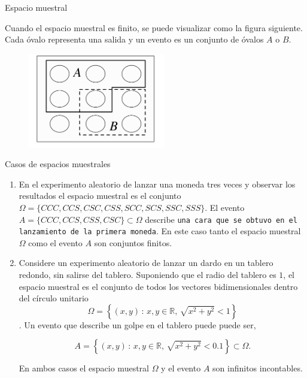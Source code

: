 \documentclass{beamer}
\begin{document}
   \begin{frame}{Espacio muestral }
   	
   	Cuando el espacio muestral es finito, se puede visualizar como la figura siguiente. Cada \'ovalo representa una salida y un evento es un conjunto de \'ovalos $A$ o $B$.
   	
   	\begin{figure}[h]
   		\centering
   		\includegraphics[width=6cm]{p1}
   	\end{figure}
   	
   	\end{frame}
 \begin{frame}{Casos de espacios muestrales}
 	
\begin{enumerate}
 \item \scriptsize {En el experimento aleatorio de lanzar una moneda tres veces y observar los resultados el espacio muestral es el conjunto $\Omega=\{CCC,CCS,CSC,CSS,SCC,SCS,SSC,SSS\}$. El evento $A=\{CCC,CCS,CSS,CSC\}\subset \Omega$ describe \texttt{una cara que se obtuvo en el lanzamiento de la primera moneda}. En este caso tanto el espacio muestral $\Omega$ como el evento $A$ son conjuntos finitos.}
 
 \item \scriptsize{ Considere un experimento aleatorio de lanzar un dardo en un tablero redondo, sin salirse del tablero. Suponiendo que el radio del tablero es $1$, el espacio muestral  es el conjunto de todos los vectores bidimensionales dentro del c\'irculo unitario $$\Omega=\left\{(x,y)\,:\, x,y\in\mathbb{R}, \,\sqrt{x^2+y^2} < 1\right\}$$. Un evento que describe un golpe en el tablero puede  puede ser,
 
 \[
 A=\left\{(x,y)\, : \,x,y\in\mathbb{R}, \,\sqrt{x^2+y^2} < 0.1\right\}\subset\Omega.
 \]
 
 En ambos casos el espacio muestral $\Omega$ y el evento $A$ son infinitos incontables.}
  \end{enumerate}
\end{frame}
\end{document}
